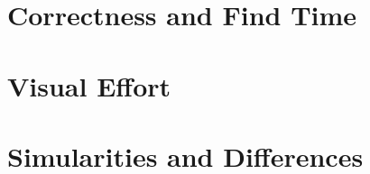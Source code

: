 \iffalse
\begin{itemize}
	\item Don’t make the reader do all the work
	\item Have hypothesis, test them, state result clearly
	\item Two lists are not a comparison
	\item Be the first to criticise your own work
\end{itemize}
\fi

\section{Correctness and Find Time}

\section{Visual Effort}

\section{Simularities and Differences}
